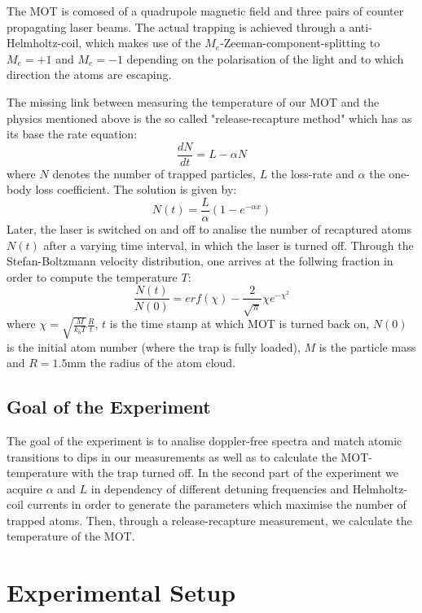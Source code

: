 \documentclass[12pt, a4paper]{article}
\begin{document}
The MOT is comosed of a quadrupole magnetic field and three pairs of counter propagating laser beams.
The actual trapping is achieved through a anti-Helmholtz-coil, which makes use of the $M_e$-Zeeman-component-splitting to $M_e = +1$ and $M_e = -1$ depending on the polarisation of the light and to which direction the atoms are escaping.

The missing link between measuring the temperature of our MOT and the physics mentioned above is the so called "release-recapture method" which has as its base the rate equation:
\begin{equation}
\frac{dN}{dt} = L - \alpha N
\end{equation}
where $N$ denotes the number of trapped particles, $L$ the loss-rate and $\alpha$ the one-body loss coefficient. The solution is given by:
\begin{equation}
N(t) = \frac{L}{\alpha}(1-e^{-\alpha x})
\end{equation}
Later, the laser is switched on and off to analise the number of recaptured atoms $N(t)$ after a varying time interval, in which the laser is turned off.
Through the Stefan-Boltzmann velocity distribution, one arrives at the follwing fraction in order to compute the temperature $T$:
\begin{equation}
\frac{N(t)}{N(0)} = erf(\chi) - \frac{2}{\sqrt{\pi}} \chi e^{-\chi ^2}
\end{equation}
where $\chi = \sqrt{\frac{M}{k_{b} T}}\frac{R}{t}$, $t$ is the time stamp at which MOT is turned back on, $N(0)$ is the initial atom number (where the trap is fully loaded), $M$ is the particle mass and $R=1.5$mm the radius of the atom cloud. \cite{script}


\subsection{Goal of the Experiment}
The goal of the experiment is to analise doppler-free spectra and match atomic transitions to dips in our measurements as well as to calculate the MOT-temperature with the trap turned off. In the second part of the experiment we acquire $\alpha$ and $L$ in dependency of different detuning frequencies and Helmholtz-coil currents in order to generate the parameters which maximise the number of trapped atoms. Then, through a release-recapture measurement, we calculate the temperature of the MOT.


\section{Experimental Setup}
\end{document}
